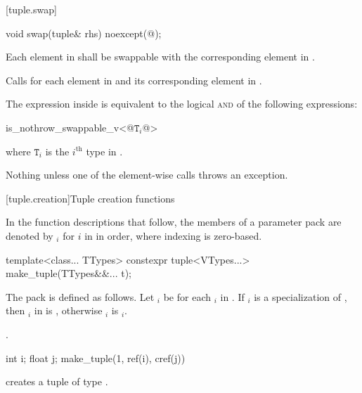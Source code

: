 [tuple.swap]{}

%
\begin{itemdecl}
void swap(tuple& rhs) noexcept(@\seebelow@);
\end{itemdecl}

\begin{itemdescr}
\pnum
\requires
Each element in  shall be swappable with
the corresponding element in .

\pnum
\effects Calls  for each element in  and its
corresponding element in .

\pnum
\remarks The expression inside  is equivalent to the logical
\textsc{and} of the following expressions:

\begin{codeblock}
is_nothrow_swappable_v<@$\mathtt{T}_i$@>
\end{codeblock}
where $\mathtt{T}_i$ is the $i^\text{th}$ type in .

\pnum
\throws Nothing unless one of the element-wise  calls throws an exception.
\end{itemdescr}

[tuple.creation]{Tuple creation functions}

\pnum
In the function descriptions that follow, the members of a parameter pack 
are denoted by $_i$ for $i$ in  in
order, where indexing is zero-based.

%
%
\begin{itemdecl}
template<class... TTypes>
  constexpr tuple<VTypes...> make_tuple(TTypes&&... t);
\end{itemdecl}

\begin{itemdescr}
\pnum
The pack  is defined as follows. Let $_i$ be  for each
$_i$ in . If $_i$ is a specialization of
, then $_i$ in  is ,
otherwise $_i$ is $_i$.

\pnum
\returns {}.

\pnum
\begin{example}
\begin{codeblock}
int i; float j;
make_tuple(1, ref(i), cref(j))
\end{codeblock}
creates a tuple of type .
\end{example}
\end{itemdescr}

